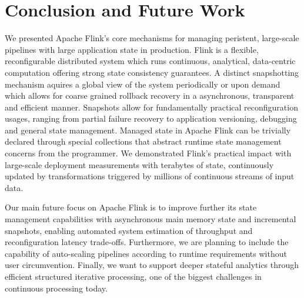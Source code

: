 
\section{Conclusion and Future Work}
\label{sec:conclusion}

We presented Apache Flink's core mechanisms for managing peristent, large-scale pipelines with large application state in production. Flink is a flexible, reconfigurable distributed system which runs continuous, analytical, data-centric computation offering strong state consistency guarantees. A distinct snapshotting mechanism aquires a global view of the system periodically or upon demand which allows for coarse grained rollback recovery in a asynchronous, transparent and efficient manner. Snapshots allow for fundamentally practical reconfiguration usages, ranging from partial failure recovery to application versioning, debugging and general state management. Managed state in Apache Flink can be trivially declared through special collections that abstract runtime state management concerns from the programmer. We demonstrated Flink's practical impact with large-scale deployment measurements with terabytes of state, continuously updated by transformations triggered by millions of continuous streams of input data.

Our main future focus on Apache Flink is to improve further its state management capabilities with asynchronous main memory state and incremental snapshots, enabling automated system estimation of throughput and reconfiguration latency trade-offs. Furthermore, we are planning to include the capability of auto-scaling pipelines according to runtime requirements without user circumvention. Finally, we want to support deeper stateful analytics through efficient structured iterative processing, one of the biggest challenges in continuous processing today.